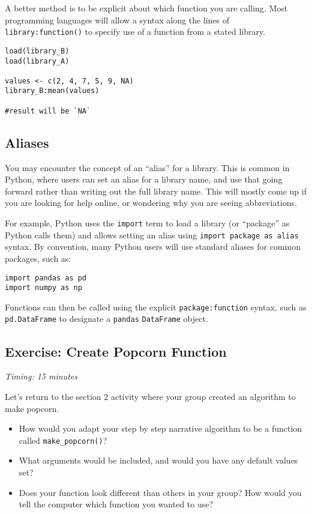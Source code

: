 \documentclass[
]{book}
\providecommand{\tightlist}{%
  \setlength{\itemsep}{0pt}\setlength{\parskip}{0pt}}
\begin{document}
A better method is to be explicit about which function you are calling. Most programming languages will allow a syntax along the lines of \texttt{library:function()} to specify use of a function from a stated library.\\

\begin{verbatim}
load(library_B)
load(library_A)

values <- c(2, 4, 7, 5, 9, NA)
library_B:mean(values)

#result will be `NA`
\end{verbatim}

\subsection{Aliases}\label{aliases}

You may encounter the concept of an ``alias'' for a library. This is common in Python, where users can set an alias for a library name, and use that going forward rather than writing out the full library name. This will mostly come up if you are looking for help online, or wondering why you are seeing abbreviations.

For example, Python uses the \texttt{import} term to load a library (or ``package'' as Python calls them) and allows setting an alias using \texttt{import\ package\ as\ alias} syntax. By convention, many Python users will use standard aliases for common packages, such as:

\begin{verbatim}
import pandas as pd
import numpy as np
\end{verbatim}

Functions can then be called using the explicit \texttt{package:function} syntax, such as \texttt{pd.DataFrame} to designate a \texttt{pandas} \texttt{DataFrame} object.

\subsection{Exercise: Create Popcorn Function}\label{exercise-create-popcorn-function}

\emph{Timing: 15 minutes}

Let's return to the section 2 activity where your group created an algorithm to make popcorn.

\begin{itemize}
\tightlist
\item
  How would you adapt your step by step narrative algorithm to be a function called \texttt{make\_popcorn()}?
\item
  What arguments would be included, and would you have any default values set?
\item
  Does your function look different than others in your group? How would you tell the computer which function you wanted to use?
\end{itemize}
\end{document}
